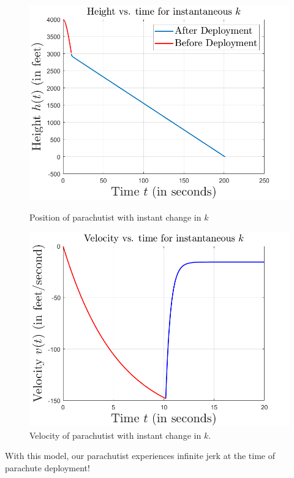 \documentclass{article}
\begin{document}
\begin{figure}[H]
        
        \begin{minipage}{0.45\textwidth}
            \centering
            \includegraphics[scale = 0.35]{heightInstantK}
            \caption{Position of parachutist with instant change in $k$}
        \end{minipage}
        \begin{minipage}{0.45\textwidth}
            \centering
            \includegraphics[scale = 0.35]{velocityInstantK}
            \caption{Velocity of parachutist with instant change in $k$.}
        \end{minipage}
    \end{figure}
    With this model, our parachutist experiences infinite jerk at the time of parachute deployment!
    \newline
\end{document}
